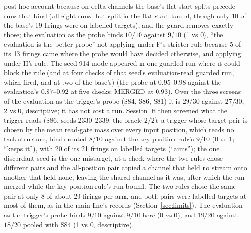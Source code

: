 \documentclass[11pt]{article}
\begin{document}
post-hoc account because on delta channels the base's flat-start splits precede runs that bind (all eight runs that split in the flat start bound, though only 10 of the base's 19 firings were on labelled targets), and the guard removes exactly those; the evaluation as the probe binds $10/10$ against $9/10$ (1 vs 0), ``the evaluation is the better probe'' not applying under F's stricter rule because 5 of its 13 firings came where the probe would have decided otherwise, and applying under H's rule. The seed-914 mode appeared in one guarded run where it could block the rule (and at four checks of that seed's evaluation-read guarded run, which fired, and at two of the base's) (the probe at $0.95$--$0.98$ against the evaluation's $0.87$--$0.92$ at five checks; MERGED at $0.93$). Over the three screens of the evaluation as the trigger's probe (S84, S86, S81) it is $29/30$ against $27/30$, 2 vs 0, descriptive; it has not cost a run. Session~H then screened what the trigger reads (S86, seeds 2330--2339; the oracle $2/2$): a trigger whose target pair is chosen by the mean read-gate mass over every input position, which reads no task structure, binds routed $8/10$ against the key-position rule's $9/10$ (0 vs 1; ``keeps it''), with 20 of its 21 firings on labelled targets (``aims''); the one discordant seed is the one mistarget, at a check where the two rules chose different pairs and the all-position pair copied a channel that held no stream onto another that held none, leaving the shared channel as it was, after which the run merged while the key-position rule's run bound. The two rules chose the same pair at only 8 of about 20 firings per arm, and both pairs were labelled targets at most of them, as in the main line's records (Section~\ref{sec:limits}). The evaluation as the trigger's probe binds $9/10$ against $9/10$ here (0 vs 0), and $19/20$ against $18/20$ pooled with S84 (1 vs 0, descriptive).
\end{document}
